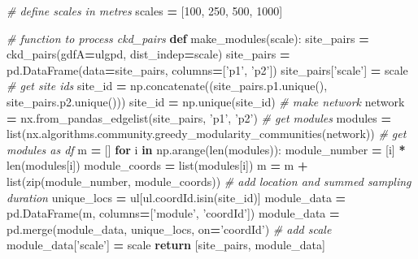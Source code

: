 \documentclass[]{article}
\newenvironment{Shaded}{\begin{snugshade}}{\end{snugshade}}
\newcommand{\BuiltInTok}[1]{#1}
\newcommand{\CommentTok}[1]{\textcolor[rgb]{0.56,0.35,0.01}{\textit{#1}}}
\newcommand{\ControlFlowTok}[1]{\textcolor[rgb]{0.13,0.29,0.53}{\textbf{#1}}}
\newcommand{\DecValTok}[1]{\textcolor[rgb]{0.00,0.00,0.81}{#1}}
\newcommand{\KeywordTok}[1]{\textcolor[rgb]{0.13,0.29,0.53}{\textbf{#1}}}
\newcommand{\NormalTok}[1]{#1}
\newcommand{\OperatorTok}[1]{\textcolor[rgb]{0.81,0.36,0.00}{\textbf{#1}}}
\newcommand{\StringTok}[1]{\textcolor[rgb]{0.31,0.60,0.02}{#1}}
\begin{document}
\begin{Shaded}
\begin{Highlighting}[numbers=left,,]
\CommentTok{# define scales in metres}
\NormalTok{scales }\OperatorTok{=}\NormalTok{ [}\DecValTok{100}\NormalTok{, }\DecValTok{250}\NormalTok{, }\DecValTok{500}\NormalTok{, }\DecValTok{1000}\NormalTok{]}


\CommentTok{# function to process ckd_pairs}
\KeywordTok{def}\NormalTok{ make_modules(scale):}
\NormalTok{    site_pairs }\OperatorTok{=}\NormalTok{ ckd_pairs(gdfA}\OperatorTok{=}\NormalTok{ulgpd, dist_indep}\OperatorTok{=}\NormalTok{scale)}
\NormalTok{    site_pairs }\OperatorTok{=}\NormalTok{ pd.DataFrame(data}\OperatorTok{=}\NormalTok{site_pairs, columns}\OperatorTok{=}\NormalTok{[}\StringTok{'p1'}\NormalTok{, }\StringTok{'p2'}\NormalTok{])}
\NormalTok{    site_pairs[}\StringTok{'scale'}\NormalTok{] }\OperatorTok{=}\NormalTok{ scale}
    \CommentTok{# get site ids}
\NormalTok{    site_id }\OperatorTok{=}\NormalTok{ np.concatenate((site_pairs.p1.unique(), site_pairs.p2.unique()))}
\NormalTok{    site_id }\OperatorTok{=}\NormalTok{ np.unique(site_id)}
    \CommentTok{# make network}
\NormalTok{    network }\OperatorTok{=}\NormalTok{ nx.from_pandas_edgelist(site_pairs, }\StringTok{'p1'}\NormalTok{, }\StringTok{'p2'}\NormalTok{)}
    \CommentTok{# get modules}
\NormalTok{    modules }\OperatorTok{=} \BuiltInTok{list}\NormalTok{(nx.algorithms.community.greedy_modularity_communities(network))}
    \CommentTok{# get modules as df}
\NormalTok{    m }\OperatorTok{=}\NormalTok{ []}
    \ControlFlowTok{for}\NormalTok{ i }\KeywordTok{in}\NormalTok{ np.arange(}\BuiltInTok{len}\NormalTok{(modules)):}
\NormalTok{        module_number }\OperatorTok{=}\NormalTok{ [i] }\OperatorTok{*} \BuiltInTok{len}\NormalTok{(modules[i])}
\NormalTok{        module_coords }\OperatorTok{=} \BuiltInTok{list}\NormalTok{(modules[i])}
\NormalTok{        m }\OperatorTok{=}\NormalTok{ m }\OperatorTok{+} \BuiltInTok{list}\NormalTok{(}\BuiltInTok{zip}\NormalTok{(module_number, module_coords))}
    \CommentTok{# add location and summed sampling duration}
\NormalTok{    unique_locs }\OperatorTok{=}\NormalTok{ ul[ul.coordId.isin(site_id)]}
\NormalTok{    module_data }\OperatorTok{=}\NormalTok{ pd.DataFrame(m, columns}\OperatorTok{=}\NormalTok{[}\StringTok{'module'}\NormalTok{, }\StringTok{'coordId'}\NormalTok{])}
\NormalTok{    module_data }\OperatorTok{=}\NormalTok{ pd.merge(module_data, unique_locs, on}\OperatorTok{=}\StringTok{'coordId'}\NormalTok{)}
    \CommentTok{# add scale}
\NormalTok{    module_data[}\StringTok{'scale'}\NormalTok{] }\OperatorTok{=}\NormalTok{ scale}
    \ControlFlowTok{return}\NormalTok{ [site_pairs, module_data]}



\end{Highlighting}
\end{Shaded}
\end{document}
